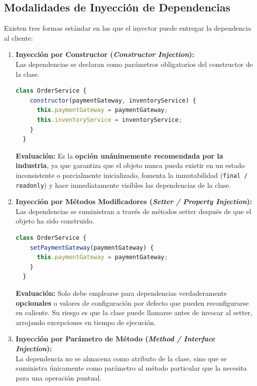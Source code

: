 \subsection{Modalidades de Inyección de Dependencias}

Existen tres formas estándar en las que el inyector puede entregar la dependencia al cliente:

\begin{enumerate}[leftmargin=1.5em]
  \item \textbf{Inyección por Constructor (\emph{Constructor Injection}):}\\
  Las dependencias se declaran como parámetros obligatorios del constructor de la clase.
  \begin{lstlisting}[language=javascript]
  class OrderService {
    constructor(paymentGateway, inventoryService) {
      this.paymentGateway = paymentGateway;
      this.inventoryService = inventoryService;
    }
  }
  \end{lstlisting}
  \textbf{Evaluación:} Es la \textbf{opción unánimemente recomendada por la industria}, ya que garantiza que el objeto nunca pueda existir en un estado inconsistente o parcialmente inicializado, fomenta la inmutabilidad (\texttt{final / readonly}) y hace inmediatamente visibles las dependencias de la clase.

  \item \textbf{Inyección por Métodos Modificadores (\emph{Setter / Property Injection}):}\\
  Las dependencias se suministran a través de métodos setter después de que el objeto ha sido construido.
  \begin{lstlisting}[language=javascript]
  class OrderService {
    setPaymentGateway(paymentGateway) {
      this.paymentGateway = paymentGateway;
    }
  }
  \end{lstlisting}
  \textbf{Evaluación:} Solo debe emplearse para dependencias verdaderamente \textbf{opcionales} o valores de configuración por defecto que pueden reconfigurarse en caliente. Su riesgo es que la clase puede llamarse antes de invocar al setter, arrojando excepciones en tiempo de ejecución.

  \item \textbf{Inyección por Parámetro de Método (\emph{Method / Interface Injection}):}\\
  La dependencia no se almacena como atributo de la clase, sino que se suministra únicamente como parámetro al método particular que la necesita para una operación puntual.
\end{enumerate}

